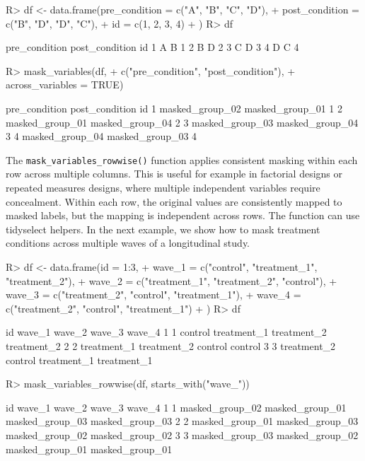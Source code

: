 \documentclass[
]{jss}
\begin{document}
\begin{CodeChunk}
\begin{CodeInput}
R> df <- data.frame(pre_condition = c("A", "B", "C", "D"),
+                  post_condition = c("B", "D", "D", "C"),
+                  id = c(1, 2, 3, 4)
+                  )
R> df
\end{CodeInput}
\begin{CodeOutput}
  pre_condition post_condition id
1             A              B  1
2             B              D  2
3             C              D  3
4             D              C  4
\end{CodeOutput}
\begin{CodeInput}
R> mask_variables(df, 
+                c("pre_condition", "post_condition"),
+                across_variables = TRUE)
\end{CodeInput}
\begin{CodeOutput}
    pre_condition  post_condition id
1 masked_group_02 masked_group_01  1
2 masked_group_01 masked_group_04  2
3 masked_group_03 masked_group_04  3
4 masked_group_04 masked_group_03  4
\end{CodeOutput}
\end{CodeChunk}

The \texttt{mask\_variables\_rowwise()} function applies consistent
masking within each row across multiple columns. This is useful for
example in factorial designs or repeated measures designs, where
multiple independent variables require concealment. Within each row, the
original values are consistently mapped to masked labels, but the
mapping is independent across rows. The function can use tidyselect
helpers. In the next example, we show how to mask treatment conditions
across multiple waves of a longitudinal study.

\begin{CodeChunk}
\begin{CodeInput}
R> df <- data.frame(id = 1:3,
+                  wave_1 = c("control", "treatment_1", "treatment_2"),
+                  wave_2 = c("treatment_1", "treatment_2", "control"),
+                  wave_3 = c("treatment_2", "control", "treatment_1"),
+                  wave_4 = c("treatment_2", "control", "treatment_1")
+                  )
R> df
\end{CodeInput}
\begin{CodeOutput}
  id      wave_1      wave_2      wave_3      wave_4
1  1     control treatment_1 treatment_2 treatment_2
2  2 treatment_1 treatment_2     control     control
3  3 treatment_2     control treatment_1 treatment_1
\end{CodeOutput}
\begin{CodeInput}
R> mask_variables_rowwise(df, starts_with("wave_"))
\end{CodeInput}
\begin{CodeOutput}
  id          wave_1          wave_2          wave_3          wave_4
1  1 masked_group_02 masked_group_01 masked_group_03 masked_group_03
2  2 masked_group_01 masked_group_03 masked_group_02 masked_group_02
3  3 masked_group_03 masked_group_02 masked_group_01 masked_group_01
\end{CodeOutput}
\end{CodeChunk}
\end{document}
